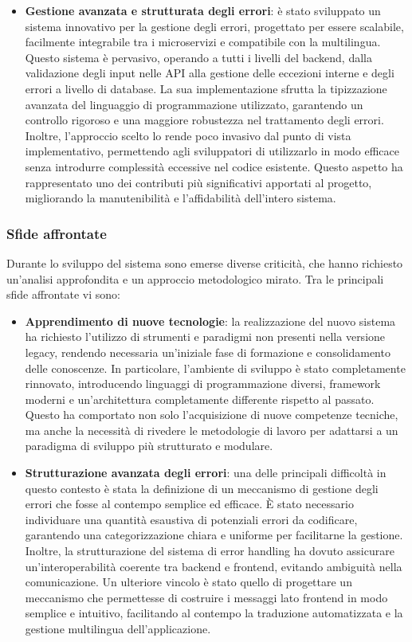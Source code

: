 \begin{itemize}
  \item \textbf{Gestione avanzata e strutturata degli errori}: è stato sviluppato un sistema innovativo per la gestione degli errori, progettato per essere scalabile, facilmente integrabile tra i microservizi e compatibile con la multilingua. Questo sistema è pervasivo, operando a tutti i livelli del backend, dalla validazione degli input nelle API alla gestione delle eccezioni interne e degli errori a livello di database. La sua implementazione sfrutta la tipizzazione avanzata del linguaggio di programmazione utilizzato, garantendo un controllo rigoroso e una maggiore robustezza nel trattamento degli errori. Inoltre, l’approccio scelto lo rende poco invasivo dal punto di vista implementativo, permettendo agli sviluppatori di utilizzarlo in modo efficace senza introdurre complessità eccessive nel codice esistente. Questo aspetto ha rappresentato uno dei contributi più significativi apportati al progetto, migliorando la manutenibilità e l'affidabilità dell’intero sistema.
\end{itemize}

\subsubsection{Sfide affrontate}
Durante lo sviluppo del sistema sono emerse diverse criticità, che hanno richiesto un'analisi approfondita e un approccio metodologico mirato. Tra le principali sfide affrontate vi sono:

\begin{itemize}
  \item \textbf{Apprendimento di nuove tecnologie}: la realizzazione del nuovo sistema ha richiesto l’utilizzo di strumenti e paradigmi non presenti nella versione legacy, rendendo necessaria un'iniziale fase di formazione e consolidamento delle conoscenze. In particolare, l’ambiente di sviluppo è stato completamente rinnovato, introducendo linguaggi di programmazione diversi, framework moderni e un'architettura completamente differente rispetto al passato. Questo ha comportato non solo l'acquisizione di nuove competenze tecniche, ma anche la necessità di rivedere le metodologie di lavoro per adattarsi a un paradigma di sviluppo più strutturato e modulare.

  \item \textbf{Strutturazione avanzata degli errori}: una delle principali difficoltà in questo contesto è stata la definizione di un meccanismo di gestione degli errori che fosse al contempo semplice ed efficace. È stato necessario individuare una quantità esaustiva di potenziali errori da codificare, garantendo una categorizzazione chiara e uniforme per facilitarne la gestione. Inoltre, la strutturazione del sistema di error handling ha dovuto assicurare un'interoperabilità coerente tra backend e frontend, evitando ambiguità nella comunicazione. Un ulteriore vincolo è stato quello di progettare un meccanismo che permettesse di costruire i messaggi lato frontend in modo semplice e intuitivo, facilitando al contempo la traduzione automatizzata e la gestione multilingua dell’applicazione.
\end{itemize}

